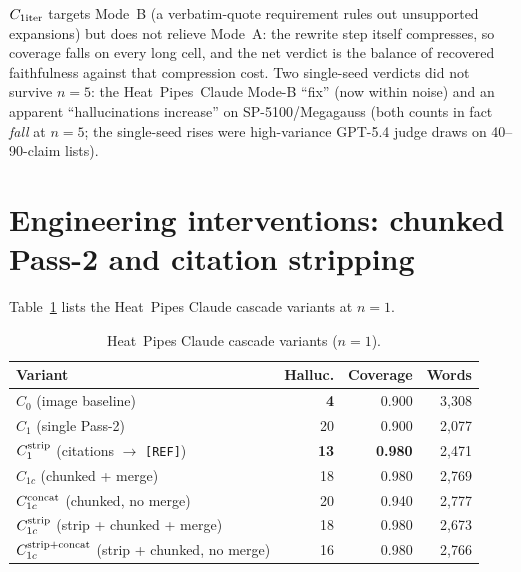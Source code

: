 \documentclass[11pt]{article}
\begin{document}
$C_{1\rm iter}$ targets Mode~B (a verbatim-quote requirement rules out unsupported expansions) but does not relieve Mode~A: the rewrite step itself compresses, so coverage falls on every long cell, and the net verdict is the balance of recovered faithfulness against that compression cost. Two single-seed verdicts did not survive $n{=}5$: the Heat~Pipes~Claude Mode-B ``fix'' (now within noise) and an apparent ``hallucinations increase'' on SP-5100/Megagauss (both counts in fact \emph{fall} at $n{=}5$; the single-seed rises were high-variance GPT-5.4 judge draws on 40--90-claim lists).

\section{Engineering interventions: chunked Pass-2 and citation stripping}
\label{appdx:fixes}

Table~\ref{tab:hp_claude_variants} lists the Heat~Pipes Claude cascade variants at $n{=}1$.

\begin{table}[h]
\centering
\caption{Heat~Pipes Claude cascade variants ($n{=}1$).}
\label{tab:hp_claude_variants}
\small
\begin{tabular}{lrrr}
\toprule
Variant & Halluc. & Coverage & Words \\
\midrule
$C_0$ (image baseline) & \textbf{4}  & 0.900 & 3{,}308 \\
$C_1$ (single Pass-2) & 20 & 0.900 & 2{,}077 \\
$C_1^{\rm strip}$ (citations $\to$ \texttt{[REF]}) & \textbf{13} & \textbf{0.980} & 2{,}471 \\
$C_{1c}$ (chunked + merge) & 18 & 0.980 & 2{,}769 \\
$C_{1c}^{\rm concat}$ (chunked, no merge) & 20 & 0.940 & 2{,}777 \\
$C_{1c}^{\rm strip}$ (strip + chunked + merge) & 18 & 0.980 & 2{,}673 \\
$C_{1c}^{\rm strip+concat}$ (strip + chunked, no merge) & 16 & 0.980 & 2{,}766 \\
\bottomrule
\end{tabular}
\end{table}
\end{document}

